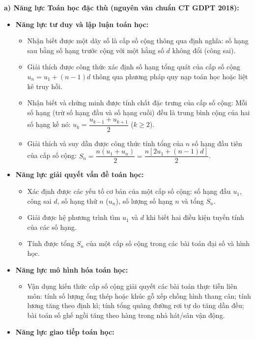 \documentclass[12pt, a4paper]{article}
\begin{document}
\textbf{a) Năng lực Toán học đặc thù (nguyên văn chuẩn CT GDPT 2018):}
\begin{itemize}[leftmargin=1.5em]
    \item \textbf{Năng lực tư duy và lập luận toán học:}
    \begin{itemize}
        \item Nhận biết được một dãy số là cấp số cộng thông qua định nghĩa: số hạng sau bằng số hạng trước cộng với một hằng số $d$ không đổi (công sai).
        \item Giải thích được công thức xác định số hạng tổng quát của cấp số cộng $u_n = u_1 + (n - 1)d$ thông qua phương pháp quy nạp toán học hoặc liệt kê truy hồi.
        \item Nhận biết và chứng minh được tính chất đặc trưng của cấp số cộng: Mỗi số hạng (trừ số hạng đầu và số hạng cuối) đều là trung bình cộng của hai số hạng kề nó: $u_k = \dfrac{u_{k-1} + u_{k+1}}{2}$ ($k \ge 2$).
        \item Giải thích và suy dẫn được công thức tính tổng của $n$ số hạng đầu tiên của cấp số cộng: $S_n = \dfrac{n(u_1 + u_n)}{2} = \dfrac{n[2u_1 + (n - 1)d]}{2}$.
    \end{itemize}
    \item \textbf{Năng lực giải quyết vấn đề toán học:}
    \begin{itemize}
        \item Xác định được các yếu tố cơ bản của một cấp số cộng: số hạng đầu $u_1$, công sai $d$, số hạng thứ $n$ ($u_n$), số lượng số hạng $n$ và tổng $S_n$.
        \item Giải được hệ phương trình tìm $u_1$ và $d$ khi biết hai điều kiện tuyến tính của các số hạng.
        \item Tính được tổng $S_n$ của một cấp số cộng trong các bài toán đại số và hình học.
    \end{itemize}
    \item \textbf{Năng lực mô hình hóa toán học:}
    \begin{itemize}
        \item Vận dụng kiến thức cấp số cộng giải quyết các bài toán thực tiễn liên môn: tính số lượng ống thép hoặc khúc gỗ xếp chồng hình thang cân; tính lương tăng theo định kì; tính tổng quãng đường rơi tự do tăng dần đều; bài toán số ghế ngồi tăng theo hàng trong nhà hát/sân vận động.
    \end{itemize}
    \item \textbf{Năng lực giao tiếp toán học:}
    \begin{itemize}

\end{itemize}
\end{itemize}
\end{document}
